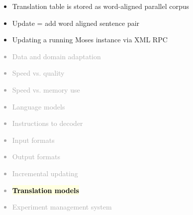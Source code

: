 \documentclass[landscape]{uedslides2C}
\newcommand{\currenttopic}[1]{\colorbox{lightyellow}{\textcolor{black}{\bf #1}}}
\begin{document}

\vspace{3cm}
\begin{itemize}
\item Translation table is stored as word-aligned parallel corpus
\item Update = add word aligned sentence pair
\item Updating a running Moses instance via XML RPC
\end{itemize}
 

\vspace{-5mm}
\textcolor{darkgrey}{
\begin{itemize} \itemsep -1mm
\item Data and domain adaptation
\item Speed vs. quality
\item Speed vs. memory use
\item Language models
\item Instructions to decoder
\item Input formats
\item Output formats
\item Incremental updating
\item \currenttopic{Translation models}
\item Experiment management system
\end{itemize}
}

\end{document}
